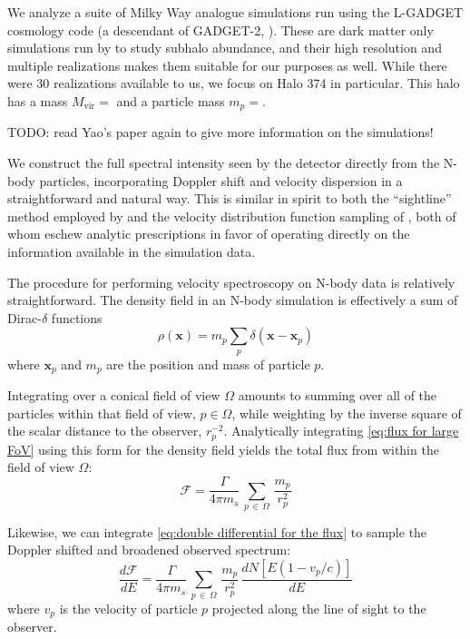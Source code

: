 \documentclass[aps,prl,10pt,twocolumn,superscriptaddress,showpacs]{revtex4-1}
\newcommand{\bvec}[1]{\mathbf{#1}}
\begin{document}
We analyze a suite of Milky Way analogue simulations run using the L-GADGET cosmology code
(a descendant of GADGET-2, \cite{springel2005}). These are dark matter only simulations 
run by \cite{mao2015} to study subhalo abundance, and their high resolution and multiple
realizations makes them suitable for our purposes as well.
While there were 30 realizations available to us, we focus on Halo 374 in particular. This
halo has a mass $M_{\mathrm{vir}}=$ and a particle mass $m_p=$.

TODO: read Yao's paper again to give more information on the simulations!

We construct the full
spectral intensity seen by the detector directly from the N-body particles, incorporating Doppler shift
and velocity dispersion in a straightforward and natural way.   This is similar in spirit to both the ``sightline'' method employed by 
\cite{lovell2015} and the velocity distribution function sampling of \cite{mao2013}, both of whom
eschew analytic prescriptions in favor of operating directly on the information available in the
simulation data. 

The procedure for performing velocity spectroscopy on N-body data is relatively straightforward.
The density field in an N-body simulation is effectively a sum of Dirac-$\delta$ functions
$$
\rho(\bvec{x}) = m_p \sum_p \delta(\bvec{x}-\bvec{x}_p)
$$
where $\bvec{x}_p$ and $m_p$ are the position and mass of particle $p$. 

Integrating over a conical
field of view $\Omega$ amounts to summing over all of the particles within that field of view, $p \in
\Omega$, while weighting by the inverse square of the scalar distance to the observer, $r^{-2}_p$. 
Analytically integrating \eqref{eq:flux for large FoV} using this form for the density field yields the
total flux from within the field of view $\Omega$:
\begin{equation} 
	\mathcal{F} = \frac{\Gamma}{4\pi m_s}
	\, \sum_{p \, \in \, \Omega} \, \frac{m_p}{r_p^{2}} 
\end{equation}

Likewise, we can integrate \eqref{eq:double differential for the flux} to sample the Doppler shifted
and broadened observed spectrum:
\begin{equation} \label{eq:discrete}
	\frac{d\mathcal{F}}{dE} = \frac{\Gamma}{4 \pi m_s}\, \sum_{p \, \in \, \Omega}
	\, \frac{m_p}{r_p^{2}} \, \frac{dN[E(1-v_p/c)]}{dE}
\end{equation}
where $v_p$ is the velocity of particle $p$ projected along the line of sight to the observer.
\end{document}
